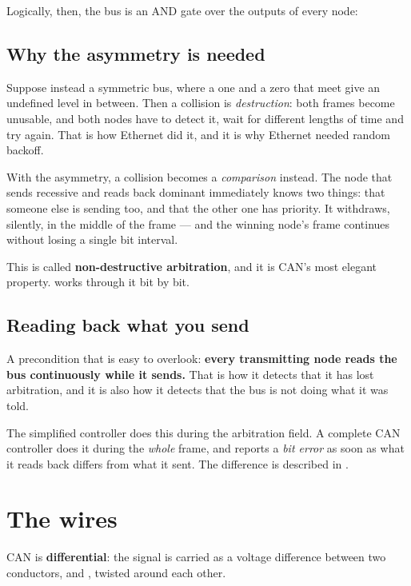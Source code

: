 Logically, then, the bus is an AND gate over the outputs of every node:


\subsection{Why the asymmetry is needed}

Suppose instead a symmetric bus, where a one and a zero that meet give an undefined level in
between. Then a collision is \emph{destruction}: both frames become unusable, and both nodes have to
detect it, wait for different lengths of time and try again. That is how Ethernet did it, and it is
why Ethernet needed random backoff.

With the asymmetry, a collision becomes a \emph{comparison} instead. The node that sends recessive
and reads back dominant immediately knows two things: that someone else is sending too, and that the
other one has priority. It withdraws, silently, in the middle of the frame --- and the winning node's
frame continues without losing a single bit interval.

This is called \textbf{non-destructive arbitration}, and it is CAN's most elegant property.
 works through it bit by bit.

\subsection{Reading back what you send}

A precondition that is easy to overlook: \textbf{every transmitting node reads the bus continuously
while it sends.} That is how it detects that it has lost arbitration, and it is also how it detects
that the bus is not doing what it was told.

The simplified controller does this during the arbitration field. A complete CAN controller does it
during the \emph{whole} frame, and reports a \emph{bit error} as soon as what it reads back differs
from what it sent. The difference is described in .

\section{The wires}

CAN is \textbf{differential}: the signal is carried as a voltage difference between two conductors,
 and , twisted around each other.

